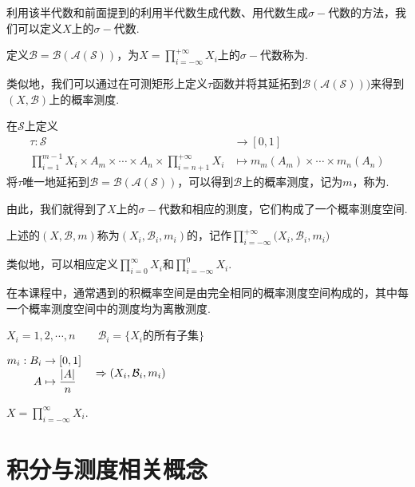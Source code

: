 利用该半代数和前面提到的利用半代数生成代数、用代数生成$\sigma-\!\!$代数的方法，我们可以定义$X$上的$\sigma-\!\!$代数.
\begin{definition}
        定义$\mathcal{B}= \mathcal{B}(\mathcal{A}(\mathcal{S}))$，为$X=\prod_{i=-\infty}^{+\infty}{X_i}$上的$\sigma-\!\!$代数称为.
\end{definition}
类似地，我们可以通过在可测矩形上定义$\tau$函数并将其延拓到$\mathcal{B}(\mathcal{A}(\mathcal{S})))$来得到$(X,\mathcal{B})$上的概率测度.
\begin{definition}
    在$\mathcal{S}$上定义
    \begin{align*}
        \tau:\mathcal{S}&\to[0,1] \\
        \prod_{i=1}^{m-1}{X_i} \times A_m \times \cdots \times A_n \times \prod_{i=n+1}^{+\infty}{X_i} &\mapsto m_m(A_m) \times \cdots \times m_n(A_n)
    \end{align*}
    将$\tau$唯一地延拓到$\mathcal{B}=\mathcal{B}(\mathcal{A}(\mathcal{S}))$，可以得到$\mathcal{B}$上的概率测度，记为$m$，称为.
\end{definition}
由此，我们就得到了$X$上的$\sigma-\!\!$代数和相应的测度，它们构成了一个概率测度空间.
\begin{definition} %
    上述的$(X,\mathcal{B},m)$称为$(X_i,\mathcal{B}_i,m_i)$的，记作$\prod_{i=-\infty}^{+\infty}{(X_i,\mathcal{B}_i,m_i})$
\end{definition}
类似地，可以相应定义$\prod_{i=0}^\infty{X_i}$和$\prod_{i=-\infty}^0{X_i}$.\par
在本课程中，通常遇到的积概率空间是由完全相同的概率测度空间构成的，其中每一个概率测度空间中的测度均为离散测度.\par
\begin{instance}
    $X_i={1,2,\cdots,n}\qquad \mathcal{B}_i=\{ X_i\text{的所有子集}\}$\par
    $\setjot\begin{aligned}
        m_i:B_i&\to[0,1] \\
        A&\mapsto\frac{|A|}{n}
    \end{aligned} \quad \Rightarrow(X_i,\mathcal{B}_i,m_i)$\par
    $X=\prod_{i=-\infty}^\infty{X_i}$.
\end{instance}


\section{积分与测度相关概念}

